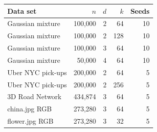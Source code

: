 \begin{tabular}{lrrrr}
\toprule
Data set & $n$ & $d$ & $k$ & Seeds \\
\midrule
Gaussian mixture & 100{,}000 & 2 & 64 & 10 \\
Gaussian mixture & 100{,}000 & 2 & 128 & 10 \\
Gaussian mixture & 100{,}000 & 3 & 64 & 10 \\
Gaussian mixture & 50{,}000 & 4 & 64 & 10 \\
Uber NYC pick-ups & 200{,}000 & 2 & 64 & 5 \\
Uber NYC pick-ups & 200{,}000 & 2 & 256 & 5 \\
3D Road Network & 434{,}874 & 3 & 64 & 5 \\
china.jpg RGB & 273{,}280 & 3 & 64 & 5 \\
flower.jpg RGB & 273{,}280 & 3 & 32 & 5 \\
\bottomrule
\end{tabular}
